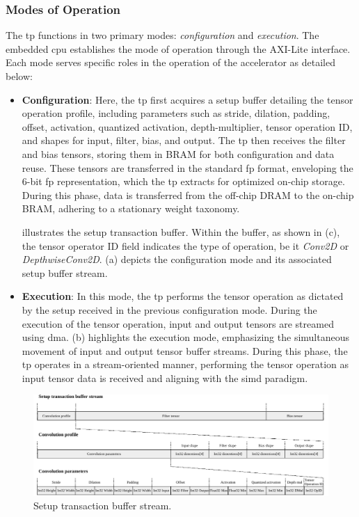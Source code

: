 \subsubsection{Modes of Operation}
The \gls{tp} functions in two primary modes: \textit{configuration} and \textit{execution}. The embedded \gls{cpu} establishes the mode of operation through the AXI-Lite interface. Each mode serves specific roles in the operation of the accelerator as detailed below:
\begin{itemize}
	\item \textbf{Configuration}: Here, the \gls{tp} first acquires a setup buffer detailing the tensor operation profile, including parameters such as stride, dilation, padding, offset, activation, quantized activation, depth-multiplier, tensor operation ID, and shapes for input, filter, bias, and output. The \gls{tp} then receives the filter and bias tensors, storing them in BRAM for both configuration and data reuse. These tensors are transferred in the standard \gls{fp} format, enveloping the 6-bit \gls{fp} representation, which the \gls{tp} extracts for optimized on-chip storage. During this phase, data is transferred from the off-chip DRAM to the on-chip BRAM, adhering to a stationary weight taxonomy.
	
	 illustrates the setup transaction buffer. Within the buffer, as shown in (c), the tensor operator ID field indicates the type of operation, be it \textit{Conv2D} or \textit{DepthwiseConv2D}. (a) depicts the configuration mode and its associated setup buffer stream.
	
	\item \textbf{Execution}: In this mode, the \gls{tp} performs the tensor operation as dictated by the setup received in the previous configuration mode. During the execution of the tensor operation, input and output tensors are streamed using \gls{dma}. (b) highlights the execution mode, emphasizing the simultaneous movement of input and output tensor buffer streams. 
	During this phase, the \gls{tp} operates in a stream-oriented manner, performing the tensor operation as input tensor data is received and aligning with the \gls{simd} paradigm.
	

\end{itemize}


\begin{figure}[h!]
	\centering
	\includegraphics[width=\textwidth]{./figures/setup_transaction_buffer_stream.pdf}
	\caption{Setup transaction buffer stream.}
	\label{fig:setup_transaction_chapter}
\end{figure}

